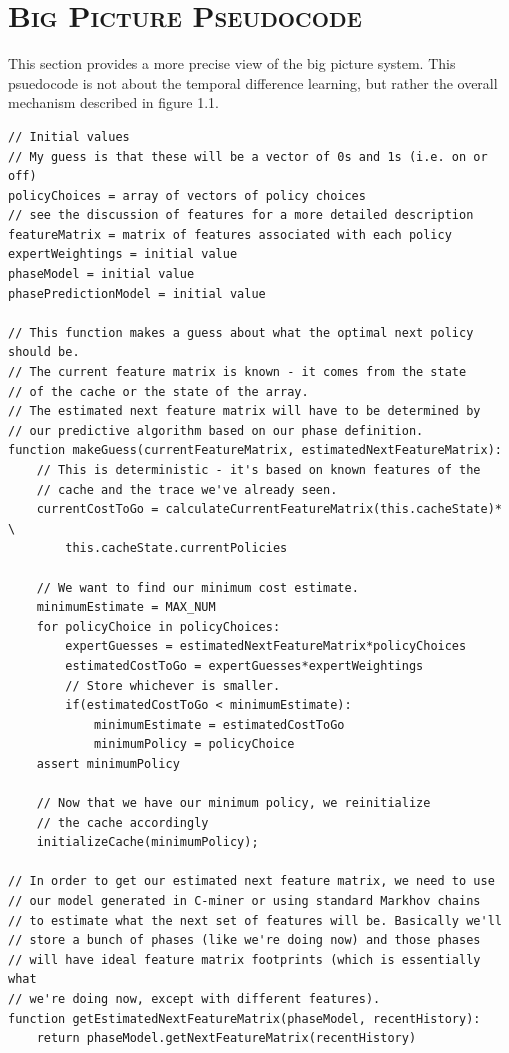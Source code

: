 \documentclass[11pt]{article}
\numberwithin{figure}{section}
\begin{document}
	\section{\textsc{Big Picture Pseudocode}}
		This section provides a more precise view of the big picture system. This psuedocode is not about the temporal difference learning, but rather the overall mechanism described in figure 1.1.
		\begin{scriptsize}
		\begin{lstlisting}
// Initial values
// My guess is that these will be a vector of 0s and 1s (i.e. on or off)
policyChoices = array of vectors of policy choices 
// see the discussion of features for a more detailed description
featureMatrix = matrix of features associated with each policy 
expertWeightings = initial value 
phaseModel = initial value
phasePredictionModel = initial value

// This function makes a guess about what the optimal next policy should be.
// The current feature matrix is known - it comes from the state 
// of the cache or the state of the array.
// The estimated next feature matrix will have to be determined by
// our predictive algorithm based on our phase definition.
function makeGuess(currentFeatureMatrix, estimatedNextFeatureMatrix):
	// This is deterministic - it's based on known features of the
	// cache and the trace we've already seen.
	currentCostToGo = calculateCurrentFeatureMatrix(this.cacheState)* \ 
		this.cacheState.currentPolicies

	// We want to find our minimum cost estimate.
	minimumEstimate = MAX_NUM
	for policyChoice in policyChoices:
		expertGuesses = estimatedNextFeatureMatrix*policyChoices
		estimatedCostToGo = expertGuesses*expertWeightings
		// Store whichever is smaller.
		if(estimatedCostToGo < minimumEstimate):
			minimumEstimate = estimatedCostToGo
			minimumPolicy = policyChoice
	assert minimumPolicy
	
	// Now that we have our minimum policy, we reinitialize
	// the cache accordingly
	initializeCache(minimumPolicy);

// In order to get our estimated next feature matrix, we need to use
// our model generated in C-miner or using standard Markhov chains
// to estimate what the next set of features will be. Basically we'll
// store a bunch of phases (like we're doing now) and those phases
// will have ideal feature matrix footprints (which is essentially what
// we're doing now, except with different features).
function getEstimatedNextFeatureMatrix(phaseModel, recentHistory):
	return phaseModel.getNextFeatureMatrix(recentHistory)


\end{lstlisting}
\end{scriptsize}
\end{document}
